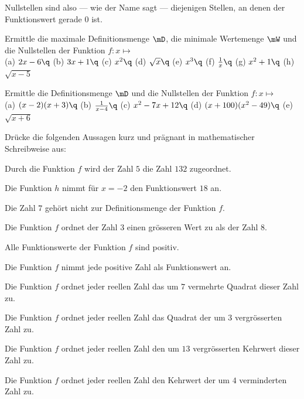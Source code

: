 \documentclass[%
11pt,%
twoside,%
titlepage,%
german,%
headsepline%
]{scrartcl}
\begin{document}
Nullstellen sind also --- wie der Name sagt --- diejenigen Stellen, an denen der Funktionswert gerade $0$ ist.
\begin{ueb}[Nullstellen]
Ermittle die maximale Definitionsmenge $\mD$, die minimale Wertemenge $\mW$ und die Nullstellen der Funktion $f:x\mapsto$\\

(a) $2x-6\q$ (b) $3x+1\q$ (c) $x^2\q$ (d) $\sqrt{x}\q$ (e) $x^3\q$ (f) $\frac{1}{x}\q$ (g) $x^2+1\q$ (h) $\sqrt{x-5}$
\end{ueb}

\begin{ueb}[Nullstellen 2]
Ermittle die Definitionsmenge $\mD$ und die Nullstellen der Funktion $f:x\mapsto$
  \\
  
  (a) $(x-2)(x+3)\q$ (b) $\frac{1}{x-4}\q$ (c) $x^2-7x+12\q$ (d) $(x+100)(x^2-49)\q$ (e) $\sqrt{x+6}$
\end{ueb}

\begin{ueb}[Schreibweise 5]
Dr\"ucke die folgenden Aussagen kurz und pr\"agnant in mathematischer Schreibweise aus:
\begin{enumeratea}
\item Durch die Funktion $f$ wird der Zahl $5$ die Zahl $132$ zugeordnet.
\item Die Funktion $h$ nimmt f\"ur $x=-2$ den Funktionswert $18$ an.
\item Die Zahl $7$ geh\"ort nicht zur Definitionsmenge der Funktion $f$.
\item Die Funktion $f$ ordnet der Zahl $3$ einen gr\"osseren Wert zu als der Zahl $8$.
\item Alle Funktionswerte der Funktion $f$ sind positiv.
\item Die Funktion $f$ nimmt jede positive Zahl als Funktionswert an.
\item Die Funktion $f$ ordnet jeder reellen Zahl das um $7$ vermehrte Quadrat dieser Zahl zu.
\item Die Funktion $f$ ordnet jeder reellen Zahl das Quadrat der um $3$ vergr\"osserten Zahl zu.
\item Die Funktion $f$ ordnet jeder reellen Zahl den um $13$ vergr\"osserten Kehrwert dieser Zahl zu.
\item Die Funktion $f$ ordnet jeder reellen Zahl den Kehrwert der um $4$ verminderten Zahl zu.
\end{enumeratea}
\end{ueb}
\end{document}
